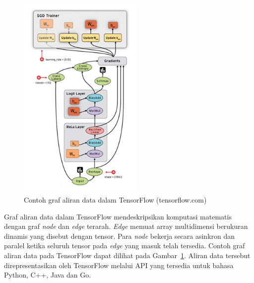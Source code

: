 \begin{figure}[h]
    \centering
    \includegraphics[width=6cm]{gambar/landasan-teori/tensorflow.jpg}
    \caption{Contoh graf aliran data dalam TensorFlow (tensorflow.com)}
    \label{gambar:tensorflow}
\end{figure}

Graf aliran data dalam TensorFlow mendeskripsikan komputasi matematis dengan graf \textit{node} dan \textit{edge} terarah. \textit{Edge} memuat array multidimensi berukuran dinamis yang disebut dengan tensor. Para \textit{node} bekerja secara asinkron dan paralel ketika seluruh tensor pada \textit{edge} yang masuk telah tersedia. Contoh graf aliran data pada TensorFlow dapat dilihat pada Gambar~\ref{gambar:tensorflow}. Aliran data tersebut direpresentasikan oleh TensorFlow melalui API yang tersedia untuk bahasa Python, C++, Java dan Go.


